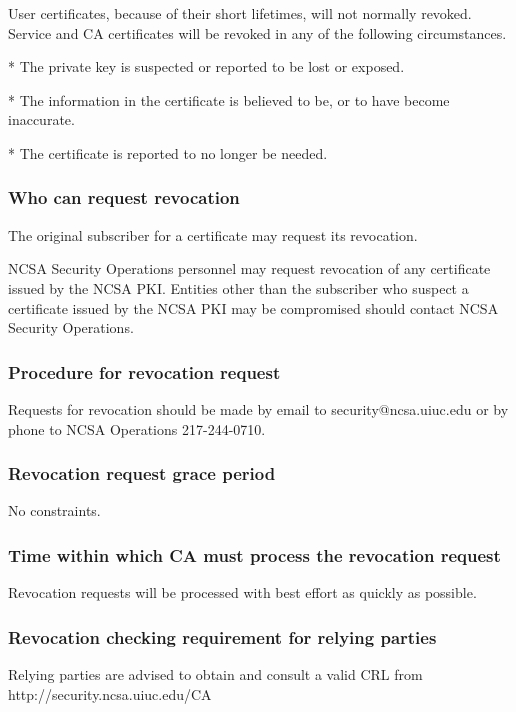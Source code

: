 \documentclass[10pt]{article}
\begin{document}
User certificates, because of their short lifetimes, will not normally
revoked. Service and CA certificates will be revoked in any of the
following circumstances.

* The private key is suspected or reported to be lost or exposed. 

* The information in the certificate is believed to be, or to have
become inaccurate. 

* The certificate is reported to no longer be needed. 

\subsubsection{Who can request revocation}

The original subscriber for a certificate may request its revocation.

NCSA Security Operations personnel may request revocation of any
certificate issued by the NCSA PKI. Entities other than the subscriber
who suspect a certificate issued by the NCSA PKI may be compromised
should contact NCSA Security Operations.

\subsubsection{Procedure for revocation request}

Requests for revocation should be made by email to
security@ncsa.uiuc.edu or by phone to NCSA Operations 217-244-0710.

\subsubsection{Revocation request grace period}

No constraints.

\subsubsection{Time within which CA must process the revocation request}

Revocation requests will be processed with best effort as quickly as
possible.

\subsubsection{Revocation checking requirement for relying parties}

Relying parties are advised to obtain and consult a valid CRL from
http://security.ncsa.uiuc.edu/CA
\end{document}
